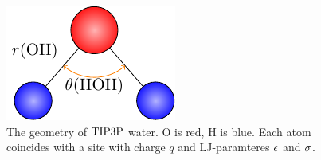 \newcommand\Odraw[1]{\shadedraw[shading=radial,outer color=red!90,inner color=red!30,draw=black] {(#1)} circle(.5cm);}
\newcommand\Hdraw[1]{\shadedraw[shading=radial,outer color=blue!90,inner color=blue!30,draw=black] {(#1)} circle(.4cm);}
\newcommand\anghoh{\enmat{\theta(\te{HOH})}}
\begin{figure}[t]
\centering
\includegraphics[width=.6\textwidth]{TikzPics/TikzCreation/Theo/TheoTIP3P.pdf} 
 \caption{The geometry of $\text{TIP3P}$ water. O is red, H is blue. Each atom coincides with a site with charge $q$ and
  LJ-paramteres $\epsilon$ and $\sigma$.}
\label{Fig:Theo:TIP3Geo}
\end{figure} 

